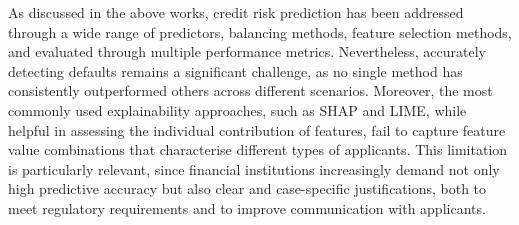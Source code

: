     As discussed in the above works, credit risk prediction has been addressed through a wide range of predictors, balancing methods, feature selection methods, and evaluated through multiple performance metrics. Nevertheless, accurately detecting defaults remains a significant challenge, as no single method has consistently outperformed others across different scenarios. Moreover, the most commonly used explainability approaches, such as SHAP and LIME, while helpful in assessing the individual contribution of features, fail to capture feature value combinations that characterise different types of applicants. This limitation is particularly relevant, since financial institutions increasingly demand not only high predictive accuracy but also clear and case-specific justifications, both to meet regulatory requirements and to improve communication with applicants. 